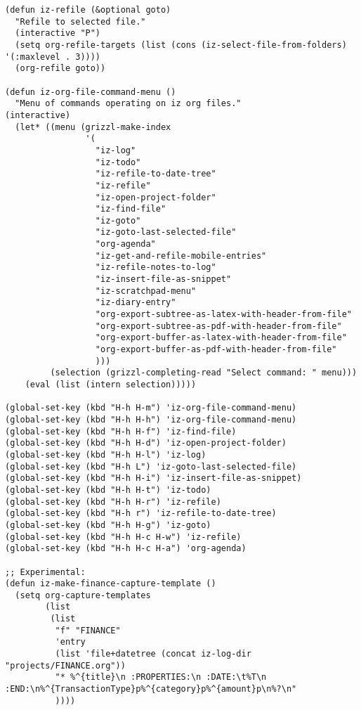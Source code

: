\documentclass[nofonts]{tufte-handout}
\begin{document}
\begin{verbatim}
(defun iz-refile (&optional goto)
  "Refile to selected file."
  (interactive "P")
  (setq org-refile-targets (list (cons (iz-select-file-from-folders) '(:maxlevel . 3))))
  (org-refile goto))

(defun iz-org-file-command-menu ()
  "Menu of commands operating on iz org files."
(interactive)
  (let* ((menu (grizzl-make-index
                '(
                  "iz-log"
                  "iz-todo"
                  "iz-refile-to-date-tree"
                  "iz-refile"
                  "iz-open-project-folder"
                  "iz-find-file"
                  "iz-goto"
                  "iz-goto-last-selected-file"
                  "org-agenda"
                  "iz-get-and-refile-mobile-entries"
                  "iz-refile-notes-to-log"
                  "iz-insert-file-as-snippet"
                  "iz-scratchpad-menu"
                  "iz-diary-entry"
                  "org-export-subtree-as-latex-with-header-from-file"
                  "org-export-subtree-as-pdf-with-header-from-file"
                  "org-export-buffer-as-latex-with-header-from-file"
                  "org-export-buffer-as-pdf-with-header-from-file"
                  )))
         (selection (grizzl-completing-read "Select command: " menu)))
    (eval (list (intern selection)))))

(global-set-key (kbd "H-h H-m") 'iz-org-file-command-menu)
(global-set-key (kbd "H-h H-h") 'iz-org-file-command-menu)
(global-set-key (kbd "H-h H-f") 'iz-find-file)
(global-set-key (kbd "H-h H-d") 'iz-open-project-folder)
(global-set-key (kbd "H-h H-l") 'iz-log)
(global-set-key (kbd "H-h L") 'iz-goto-last-selected-file)
(global-set-key (kbd "H-h H-i") 'iz-insert-file-as-snippet)
(global-set-key (kbd "H-h H-t") 'iz-todo)
(global-set-key (kbd "H-h H-r") 'iz-refile)
(global-set-key (kbd "H-h r") 'iz-refile-to-date-tree)
(global-set-key (kbd "H-h H-g") 'iz-goto)
(global-set-key (kbd "H-h H-c H-w") 'iz-refile)
(global-set-key (kbd "H-h H-c H-a") 'org-agenda)

;; Experimental:
(defun iz-make-finance-capture-template ()
  (setq org-capture-templates
        (list
         (list
          "f" "FINANCE"
          'entry
          (list 'file+datetree (concat iz-log-dir "projects/FINANCE.org"))
          "* %^{title}\n :PROPERTIES:\n :DATE:\t%T\n :END:\n%^{TransactionType}p%^{category}p%^{amount}p\n%?\n"
          ))))
\end{verbatim}
\end{document}
